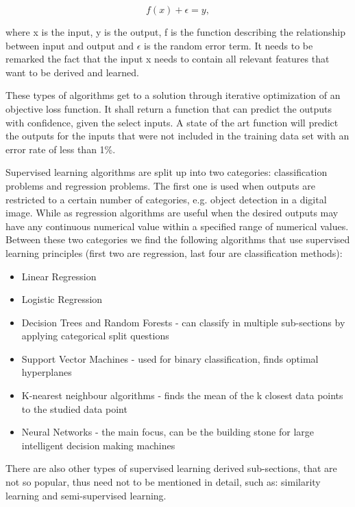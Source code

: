\documentclass[12pt,a4paper,twoside]{report}
\begin{document}
\begin{equation}
f(x)+\epsilon=y,
\label{eq:supervisedequation}
\end{equation}

where x is the input, y is the output, f is the function describing the relationship between input and output and $\epsilon$ is the random error term. It needs to be remarked the fact that the input x needs to contain all relevant features that want to be derived and learned.\par

These types of algorithms get to a solution through iterative optimization of an objective loss function. It shall return a function that can predict the outputs with confidence, given the select inputs. A state of the art function will predict the outputs for the inputs that were not included in the training data set with an error rate of less than 1\%.\par

Supervised learning algorithms are split up into two categories: classification problems and regression problems. The first one is used when outputs are restricted to a certain number of categories, e.g. object detection in a digital image. While as regression algorithms are useful when the desired outputs may have any continuous numerical value within a specified range of numerical values. Between these two categories we find the following algorithms that use supervised learning principles (first two are regression, last four are classification methods):
\begin{itemize}
    \item Linear Regression 
    \item Logistic Regression
    \item Decision Trees and Random Forests - can classify in multiple sub-sections by applying categorical split questions
    \item Support Vector Machines - used for binary classification, finds optimal hyperplanes
    \item K-nearest neighbour algorithms - finds the mean of the k closest data points to the studied data point
    \item Neural Networks - the main focus, can be the building stone for large intelligent decision making machines
\end{itemize}


There are also other types of supervised learning derived sub-sections, that are not so popular, thus need not to be mentioned in detail, such as: similarity learning and semi-supervised learning. \par
\end{document}
